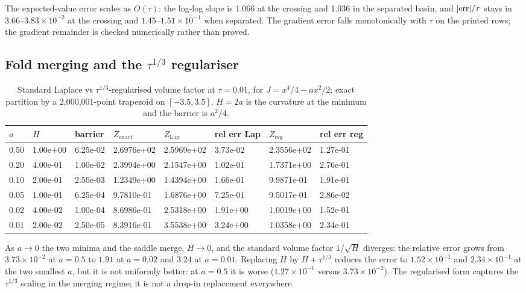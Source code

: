 The expected-value error scales as $O(\tau)$: the log-log slope is 1.066 at the crossing and 1.036 in the separated basin, and $|{\rm err}|/\tau$ stays in $3.66$--$3.83\times10^{-2}$ at the crossing and $1.45$--$1.51\times10^{-1}$ when separated. The gradient error falls monotonically with $\tau$ on the printed rows; the gradient remainder is checked numerically rather than proved.

\subsection{Fold merging and the \texorpdfstring{$\tau^{1/3}$}{tau^(1/3)} regulariser}\label{sec:fold1d}

\begin{table}[t]
\centering
\caption{Standard Laplace vs $\tau^{1/3}$-regularised volume factor at $\tau=0.01$, for $J=x^4/4-ax^2/2$; exact partition by a 2{,}000{,}001-point trapezoid on $[-3.5,3.5]$. $H=2a$ is the curvature at the minimum and the barrier is $a^2/4$.}
\label{tab:fold}
\scriptsize
\setlength{\tabcolsep}{2.5pt}
\begin{tabular}{@{}l l l l l l l l@{}}
\toprule
$a$ & $H$ & barrier & $Z_{\mathrm{exact}}$ & $Z_{\mathrm{Lap}}$ & rel err Lap & $Z_{\mathrm{reg}}$ & rel err reg\\
\midrule
0.50 & 1.00e+00 & 6.25e-02 & 2.6976e+02 & 2.5969e+02 & 3.73e-02 & 2.3556e+02 & 1.27e-01\\
0.20 & 4.00e-01 & 1.00e-02 & 2.3994e+00 & 2.1547e+00 & 1.02e-01 & 1.7371e+00 & 2.76e-01\\
0.10 & 2.00e-01 & 2.50e-03 & 1.2349e+00 & 1.4394e+00 & 1.66e-01 & 9.9871e-01 & 1.91e-01\\
0.05 & 1.00e-01 & 6.25e-04 & 9.7810e-01 & 1.6876e+00 & 7.25e-01 & 9.5017e-01 & 2.86e-02\\
0.02 & 4.00e-02 & 1.00e-04 & 8.6986e-01 & 2.5318e+00 & 1.91e+00 & 1.0019e+00 & 1.52e-01\\
0.01 & 2.00e-02 & 2.50e-05 & 8.3916e-01 & 3.5538e+00 & 3.24e+00 & 1.0358e+00 & 2.34e-01\\
\bottomrule
\end{tabular}
\end{table}

As $a\to0$ the two minima and the saddle merge, $H\to0$, and the standard volume factor $1/\sqrt{H}$ diverges: the relative error grows from $3.73\times10^{-2}$ at $a=0.5$ to $1.91$ at $a=0.02$ and $3.24$ at $a=0.01$. Replacing $H$ by $H+\tau^{1/3}$ reduces the error to $1.52\times10^{-1}$ and $2.34\times10^{-1}$ at the two smallest $a$, but it is not uniformly better: at $a=0.5$ it is worse ($1.27\times10^{-1}$ versus $3.73\times10^{-2}$). The regularised form captures the $\tau^{1/3}$ scaling in the merging regime; it is not a drop-in replacement everywhere.

